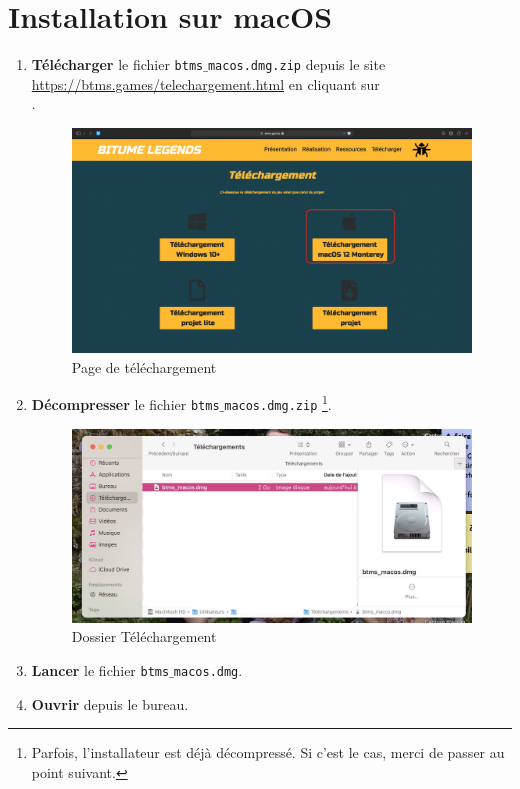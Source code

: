 \documentclass[a4paper,12pt]{article}
\begin{document}
    \section{Installation sur macOS}
        \begin{enumerate}
            \item
                \textbf{Télécharger} le fichier \texttt{btms$\_$macos.dmg.zip}
                depuis le site \\\url{https://btms.games/telechargement.html} en
                cliquant sur \\.\\
                \begin{figure}[h]
                    \includegraphics[scale=0.22]{dl_page_mac.png}
                    \caption{Page de téléchargement}
                \end{figure}
            
            \clearpage
            \item
                \textbf{Décompresser} le fichier \texttt{btms$\_$macos.dmg.zip}
                \footnote{Parfois, l'installateur est déjà décompressé. Si c'est
                le cas, merci de passer au point suivant.}.\\
                \begin{figure}[h]
                    \includegraphics[scale=0.5]{dmg_in_dl.png}
                    \caption{Dossier Téléchargement}
                \end{figure}
            \item
                \textbf{Lancer} le fichier \texttt{btms$\_$macos.dmg}.
            \item
                \textbf{Ouvrir}  depuis le bureau.
            

\end{enumerate}
\end{document}
